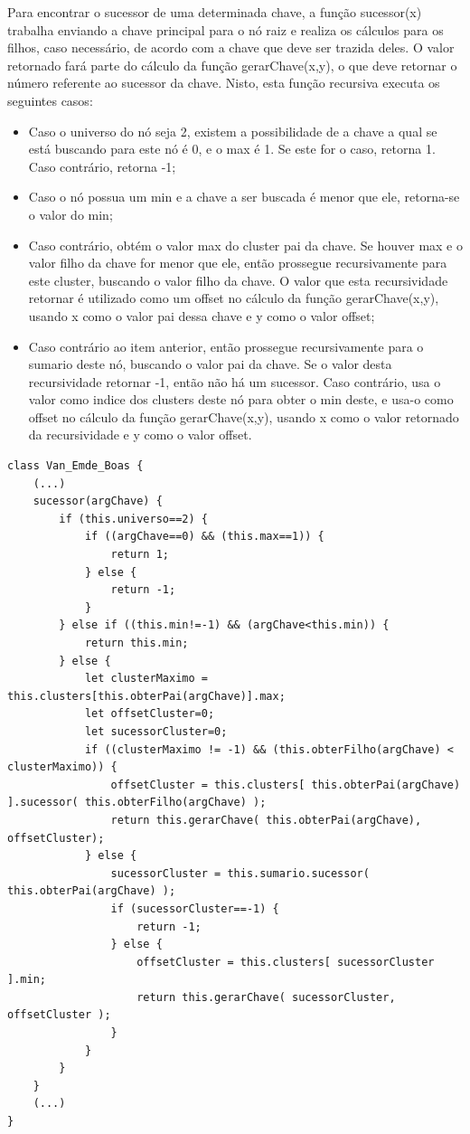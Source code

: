 \documentclass[12pt]{article}
\begin{document}
Para encontrar o sucessor de uma determinada chave, a função sucessor(x) trabalha enviando a chave principal para o nó raiz e realiza os cálculos para os filhos, caso necessário, de acordo com a chave que deve ser trazida deles. O valor retornado fará parte do cálculo da função gerarChave(x,y), o que deve retornar o número referente ao sucessor da chave. Nisto, esta função recursiva executa os seguintes casos:
\begin{itemize}
    \item Caso o universo do nó seja 2, existem a possibilidade de a chave a qual se está buscando para este nó é 0, e o max é 1. Se este for o caso, retorna 1. Caso contrário, retorna -1;
    \item Caso o nó possua um min e a chave a ser buscada é menor que ele, retorna-se o valor do min;
    \item Caso contrário, obtém o valor max do cluster pai da chave. Se houver max e o valor filho da chave for menor que ele, então prossegue recursivamente para este cluster, buscando o valor filho da chave. O valor que esta recursividade retornar é utilizado como um offset no cálculo da função gerarChave(x,y), usando x como o valor pai dessa chave e y como o valor offset;
    \item Caso contrário ao item anterior, então prossegue recursivamente para o sumario deste nó, buscando o valor pai da chave. Se o valor desta recursividade retornar -1, então não há um sucessor. Caso contrário, usa o valor como indice dos clusters deste nó para obter o min deste, e usa-o como offset no cálculo da função gerarChave(x,y), usando x como o valor retornado da recursividade e y como o valor  offset.
\end{itemize}

\begin{verbatim}
class Van_Emde_Boas {
    (...)
    sucessor(argChave) {
        if (this.universo==2) {
            if ((argChave==0) && (this.max==1)) {
                return 1;
            } else {
                return -1;
            }
        } else if ((this.min!=-1) && (argChave<this.min)) {
            return this.min;
        } else {
            let clusterMaximo = this.clusters[this.obterPai(argChave)].max;
            let offsetCluster=0;
            let sucessorCluster=0;
            if ((clusterMaximo != -1) && (this.obterFilho(argChave) < clusterMaximo)) {
                offsetCluster = this.clusters[ this.obterPai(argChave) ].sucessor( this.obterFilho(argChave) );
                return this.gerarChave( this.obterPai(argChave), offsetCluster);
            } else {
                sucessorCluster = this.sumario.sucessor( this.obterPai(argChave) );
                if (sucessorCluster==-1) {
                    return -1;
                } else {
                    offsetCluster = this.clusters[ sucessorCluster ].min;
                    return this.gerarChave( sucessorCluster, offsetCluster );
                }
            }
        }
    }
    (...)
}
\end{verbatim}
\end{document}
